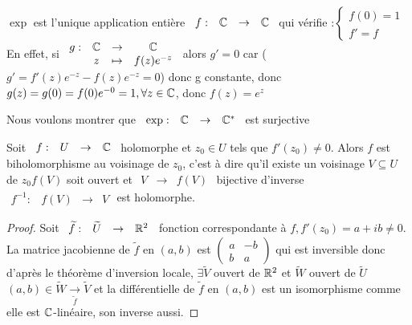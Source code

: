 \documentclass[]{report}
\begin{document}
\begin{re}
    $\exp$ est l'unique application entière $\begin{array}{ccccc}
f : & \mathbb{C} & \to & \mathbb{C} 
\end{array}$ qui vérifie :$\begin{cases}
    f(0)=1\\
    f'=f
\end{cases}$\\
En effet, si $\begin{array}{ccccc}
g : & \mathbb{C} & \to & \mathbb{C} \\
  & z & \mapsto & f(z)e^{-z}  
\end{array}$ alors $g'=0$ car ($g'=f'(z)e^{-z}-f(z)e^{-z}=0$) donc g constante, donc $g(z)=g(0)=f(0)e^{-0}=1,\forall z \in \mathbb{C}$, donc $f(z)=e^z$
\end{re}

Nous voulons montrer que $\begin{array}{ccccc}
\exp : & \mathbb{C} & \to & \mathbb{C}^*
\end{array}$ est surjective

\begin{prop}
    Soit $\begin{array}{ccccc}
f : & U & \to & \mathbb{C}
\end{array}
$ holomorphe et $z_0\in U$ tels que $f'(z_0)\neq 0$. Alors $f$ est biholomorphisme au voisinage de $z_0$, c'est à dire qu'il existe un voisinage $V\subseteq U$ de $z_0$\tq $f(V)$ soit ouvert et $\begin{array}{ccccc}
V & \to & f(V)
\end{array}$ bijective d'inverse $\begin{array}{ccccc}
f^{-1} : & f(V) & \to & V
\end{array}$ est holomorphe.
\end{prop}

\begin{proof}
    Soit $\begin{array}{ccccc}
\widetilde{f} : & \widetilde{U} & \to & \mathbb{R}^2
\end{array}$ fonction correspondante à $f, f'(z_0)=a+ib\neq 0$.\\
La matrice jacobienne de $\widetilde{f}$ en $(a,b)$ est $\begin{pmatrix}
a & -b \\
b & a
\end{pmatrix}$ qui est inversible donc d'après le théorème d'inversion locale, $\exists \widetilde{V}$ ouvert de $\mathbb{R}^2$ et $\widetilde{W}$ ouvert de $\widetilde{U}$ \tq $(a,b)\in \widetilde{W}\underset{\widetilde{f}}{\longrightarrow} \widetilde{V}$ et la différentielle de $\widetilde{f}$ en $(a,b)$ est un isomorphisme comme elle est $\mathbb{C}$-linéaire, son inverse aussi.
\end{proof}
\end{document}
